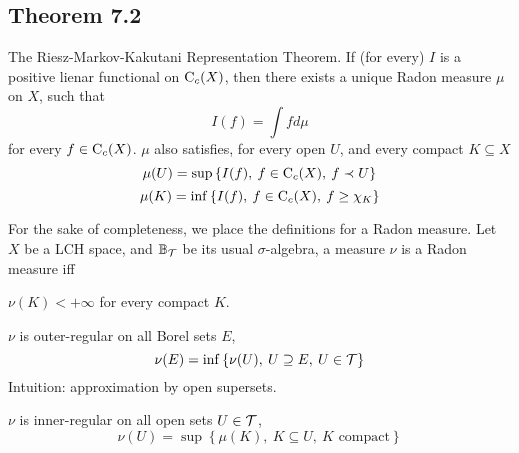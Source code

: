 \documentclass[../../main.tex]{subfiles}
\begin{document}
\subsection{Theorem 7.2}
\begin{wts}
    The Riesz-Markov-Kakutani Representation Theorem. If (for every) $I$ is a positive lienar functional on $\operatorname{C}_c({X})$, then there exists a unique Radon measure $\mu$ on $X$, such that
    \[
    I(f) = \int fd\mu
    \]
    for every $f\in\operatorname{C}_c({X})$. $\mu$ also satisfies, for every open $U$, and every compact $K\subseteq X$
    \begin{equation}\label{open approximated by If}
        \mu(U) = \sup\left\{I(f),\:f\in\operatorname{C}_c({X}),\:f\prec U\right\}
    \end{equation}
    \begin{equation}\label{compact approximated by If}
        \mu(K)=\inf\left\{I(f),\:f\in\operatorname{C}_c({X}),\:f\geq\chi_K\right\}
    \end{equation}
\end{wts}
\newcommand{\borel}{\mathbb{B}_{\Tau}} %
\newcommand{\mustar}{\mu^*} %
%
For the sake of completeness, we place the definitions for a Radon measure. Let $X$ be a LCH space, and $\borel$ be its usual $\sigma$-algebra, a measure $\nu$ is a Radon measure iff
\begin{enumroman}
    \item $\nu(K)<+\infty$ for every compact $K$.
    \item $\nu$ is outer-regular on all Borel sets $E$,
    \[
    \nu(E) = \inf\left\{\nu(U),\: U\supseteq E,\:U\in\mathcal{T}\right\}
    \]
    Intuition: approximation by open supersets.
    \item $\nu$ is inner-regular on all open sets $U\in\mathcal{T}$,
    \[
    \nu(U) = \sup\left\{\mu(K),\: K\subseteq U,\:K\text{ compact}\right\}
    \]
\end{enumroman}
%
\end{document}
